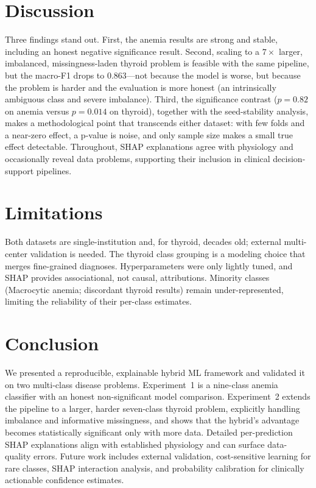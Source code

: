 \documentclass[conference]{IEEEtran}
\begin{document}
\section{Discussion}
Three findings stand out. First, the anemia results are strong and stable,
including an honest negative significance result. Second, scaling to a $7\times$
larger, imbalanced, missingness-laden
thyroid problem is feasible with the same pipeline, but the macro-F1 drops to
$0.863$---not because the model is worse, but because the problem is harder and the
evaluation is more honest (an intrinsically ambiguous class and severe imbalance).
Third, the significance contrast ($p{=}0.82$ on anemia versus $p{=}0.014$ on
thyroid), together with the seed-stability analysis, makes a methodological point
that transcends either dataset: with few folds and a near-zero effect, a p-value is
noise, and only sample size makes a small true effect detectable. Throughout,
SHAP explanations agree with physiology and occasionally reveal data problems,
supporting their inclusion in clinical decision-support pipelines.

\section{Limitations}
Both datasets are single-institution and, for thyroid, decades old; external
multi-center validation is needed. The thyroid class grouping is a modeling choice
that merges fine-grained diagnoses. Hyperparameters were only lightly tuned, and
SHAP provides associational, not causal, attributions. Minority classes
(Macrocytic anemia; discordant thyroid results) remain under-represented, limiting
the reliability of their per-class estimates.

\section{Conclusion}
We presented a reproducible, explainable hybrid ML framework and validated it on
two multi-class disease problems. Experiment~1 is a nine-class anemia classifier
with an honest non-significant model comparison. Experiment~2 extends the pipeline
to a larger, harder seven-class thyroid problem,
explicitly handling imbalance and informative missingness, and shows that the
hybrid's advantage becomes statistically significant only with more data. Detailed
per-prediction SHAP explanations align with established physiology and can surface
data-quality errors. Future work includes external validation, cost-sensitive
learning for rare classes, SHAP interaction analysis, and probability calibration
for clinically actionable confidence estimates.
\end{document}
